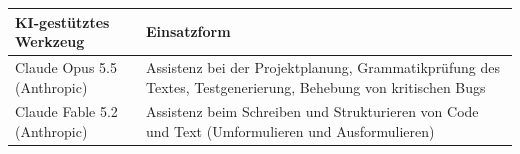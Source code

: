 \begin{tabularx}{\textwidth}{|l|X|}
    \hline
    \textbf{KI-gestütztes Werkzeug} & \textbf{Einsatzform} \\
    \hline
    Claude Opus 5.5 (Anthropic) & Assistenz bei der Projektplanung, Grammatikprüfung des Textes, Testgenerierung, Behebung von kritischen Bugs \\
    \hline
    Claude Fable 5.2 (Anthropic) & Assistenz beim Schreiben und Strukturieren von Code und Text (Umformulieren und Ausformulieren) \\
    \hline
\end{tabularx}
